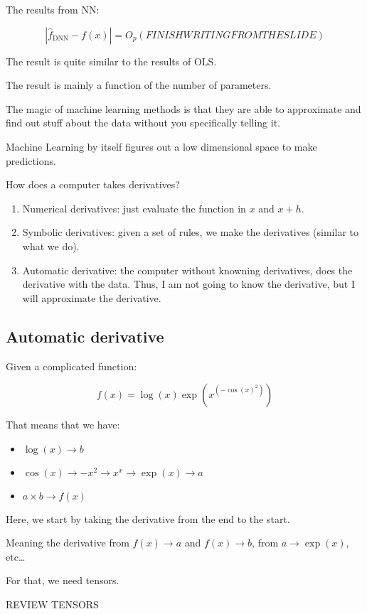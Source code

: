 \documentclass{article}
\begin{document}
The results from NN:

$$
\left| \hat{f}_{\text{DNN}} - f(x) \right| = O_p (FINISH WRITING FROM THE SLIDE)
$$

The result is quite similar to the results of OLS.

The result is mainly a function of the number of parameters.

The magic of machine learning methods is that they are able to approximate and find out stuff about the data without you specifically telling it.

Machine Learning by itself figures out a low dimensional space to make predictions.

How does a computer takes derivatives?
\begin{enumerate}
    \item Numerical derivatives: just evaluate the function in $x$ and $x + h$.
    \item Symbolic derivatives: given a set of rules, we make the derivatives (similar to what we do).
    \item Automatic derivative: the computer without knowning derivatives, does the derivative with the data. Thus, I am not going to know the derivative, but I will approximate the derivative.
\end{enumerate}

\subsection{Automatic derivative}

Given a complicated function:

$$
f(x) = \log(x) \exp \left(x^{\left( -\cos(x)^2 \right)} \right)
$$

That means that we have:

\begin{itemize}
    \item $\log(x) \to b$
    \item $\cos(x) \to -x^2 \to x^x \to \exp(x) \to a$
    \item $a \times b \to f(x)$
\end{itemize}

Here, we start by taking the derivative from the end to the start.

Meaning the derivative from $f(x) \to a$ and $f(x) \to b$, from $a \to \exp(x)$, etc\dots

For that, we need tensors.

REVIEW TENSORS
\end{document}

